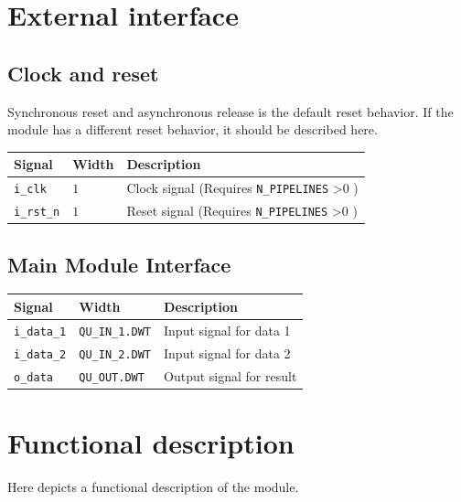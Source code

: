 \documentclass[a4paper, oneside]{report}
\begin{document}
        \section{External interface}
            \subsection{Clock and reset}
                Synchronous reset and asynchronous release is the default reset behavior. If the module has a different reset behavior, it should be described here.
                \begin{longtable}{lll}
                    \toprule
                    \textbf{Signal}      & \textbf{Width}    & \textbf{Description} \\
                    \midrule
                    \texttt{i\_clk}      & $1$                 & Clock signal (Requires \texttt{N\_PIPELINES} >0 ) \\
                    \texttt{i\_rst\_n}   & $1$                 & Reset signal (Requires \texttt{N\_PIPELINES} >0 ) \\
                    \bottomrule
                \end{longtable}
            \subsection{Main Module Interface}
                \begin{longtable}{lll}
                    \toprule
                    \textbf{Signal}      & \textbf{Width}    & \textbf{Description} \\
                    \midrule
                    \texttt{i\_data\_1}      & \texttt{QU\_IN\_1.DWT}         & Input signal for data 1 \\
                    \texttt{i\_data\_2}      & \texttt{QU\_IN\_2.DWT}        & Input signal for data 2 \\
                    \texttt{o\_data}    & \texttt{QU\_OUT.DWT}         & Output signal for result \\
                    \bottomrule
                \end{longtable}
        
        \section{Functional description}
        Here depicts a functional description of the module.
\end{document}

